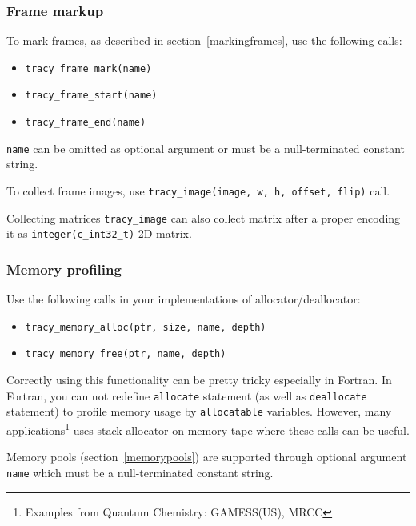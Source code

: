 \documentclass[hidelinks,titlepage,a4paper,twoside]{article}
\begin{document}
\subsubsection{Frame markup}

To mark frames, as described in section~\ref{markingframes}, use the following calls:

\begin{itemize}
\item \texttt{tracy\_frame\_mark(name)}
\item \texttt{tracy\_frame\_start(name)}
\item \texttt{tracy\_frame\_end(name)}
\end{itemize}

\texttt{name} can be omitted as optional argument or must be a null-terminated constant string.

To collect frame images, use \texttt{tracy\_image(image, w, h, offset, flip)} call.

\begin{bclogo}[
noborder=true,
couleur=black!5,
logo=\bclampe
]{Collecting matrices}
\texttt{tracy\_image} can also collect matrix after a proper encoding it as \texttt{integer(c\_int32\_t)} 2D matrix.
\end{bclogo}

\subsubsection{Memory profiling}

Use the following calls in your implementations of allocator/deallocator:

\begin{itemize}
\item \texttt{tracy\_memory\_alloc(ptr, size, name, depth)}
\item \texttt{tracy\_memory\_free(ptr, name, depth)}
\end{itemize}

Correctly using this functionality can be pretty tricky especially in Fortran.
In Fortran, you can not redefine \texttt{allocate} statement (as well as \texttt{deallocate} statement) to profile memory usage by \texttt{allocatable} variables.
However, many applications\footnote{Examples from Quantum Chemistry: GAMESS(US), MRCC} uses stack allocator on memory tape where these calls can be useful.

Memory pools (section~\ref{memorypools}) are supported through optional argument \texttt{name} which must be a null-terminated constant string.
\end{document}

